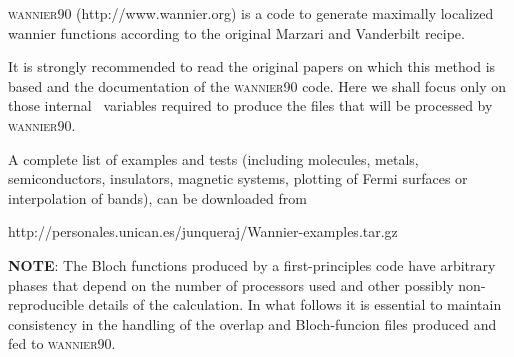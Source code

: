 \textsc{wannier90} (http://www.wannier.org) is a code to generate
maximally localized wannier functions according to the original
Marzari and Vanderbilt recipe.

It is strongly recommended to read the original papers on which this
method is based and the  documentation of the \textsc{wannier90} code.
Here we shall focus only on those internal \siesta\ variables
required to produce the files that will be processed
by \textsc{wannier90}.

A complete list of examples and tests (including molecules, metals, 
semiconductors, insulators, magnetic systems, plotting of Fermi surfaces
or interpolation of bands), can be downloaded from

 http://personales.unican.es/junqueraj/Wannier-examples.tar.gz

\textbf{NOTE}: The Bloch functions produced by a first-principles code
      have arbitrary phases that depend on the number of processors
      used and other possibly non-reproducible details of the
      calculation. In what follows it is essential to maintain
      consistency in the handling of the overlap and Bloch-funcion
      files produced and fed to \textsc{wannier90}.

